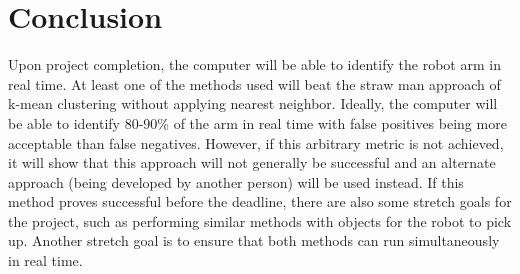 \documentclass[10pt,journal,compsoc, draftclsnofoot,onecolumn]{IEEEtran}
\begin{document}
\section{Conclusion}
 Upon project completion, the computer will be able to identify the robot arm in real time.
At least one of the methods used will beat the straw man approach of k-mean clustering without applying nearest neighbor.
Ideally, the computer will be able to identify 80-90\% of the arm in real time with false positives being more acceptable than false negatives.
However, if this arbitrary metric is not achieved, it will show that this approach will not generally
be successful and an alternate approach (being developed by another person) will be used instead.
If this method proves successful before the deadline, there are also some stretch goals for the project, such as performing similar methods with objects for the robot to pick up.
Another stretch goal is to ensure that both methods can run simultaneously in real time.


\newpage
\nocite{*}%


\end{document}
